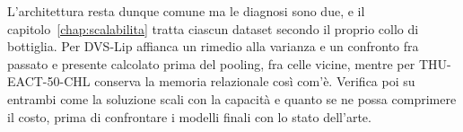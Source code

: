 L'architettura resta dunque comune ma le diagnosi sono due, e il capitolo~\ref{chap:scalabilita} tratta ciascun dataset secondo il proprio collo di bottiglia. Per DVS-Lip affianca un rimedio alla varianza e un confronto fra passato e presente calcolato prima del pooling, fra celle vicine, mentre per THU-EACT-50-CHL conserva la memoria relazionale così com'è. Verifica poi su entrambi come la soluzione scali con la capacità e quanto se ne possa comprimere il costo, prima di confrontare i modelli finali con lo stato dell'arte.


